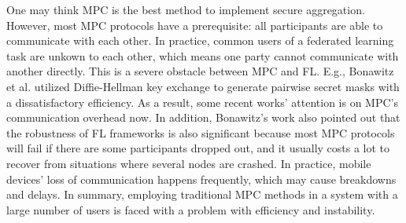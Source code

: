 One may think MPC is the best method to implement secure aggregation. However, most MPC protocols have a prerequisite: all participants are able to communicate with each other. In practice, common users of a federated learning task are unkown to each other, which means one party cannot communicate with another directly. This is a severe obstacle between MPC and FL. E.g., Bonawitz et al.\cite{Practical} utilized Diffie-Hellman key exchange to generate pairwise secret masks with a dissatisfactory efficiency. As a result, some recent works' attention is on MPC's communication overhead now\cite{Weighted,Two-Phase}. In addition, Bonawitz's work also pointed out that the robustness of FL frameworks is also significant because most MPC protocols will fail if there are some participants dropped out, and it usually costs a lot to recover from situations where several nodes are crashed. In practice, mobile devices' loss of communication happens frequently, which may cause breakdowns and delays. In summary, employing traditional MPC methods in a system with a large number of users is faced with a problem with efficiency and instability.


